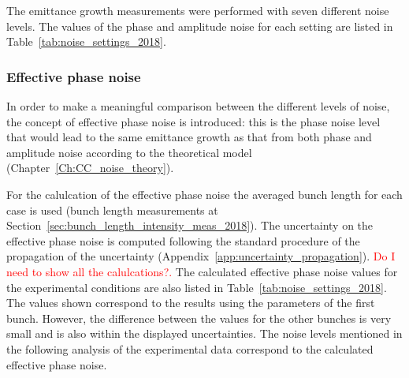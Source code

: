
The emittance growth measurements were performed with seven different noise levels. The values of the phase and amplitude noise for each setting are listed in Table~\ref{tab:noise_settings_2018}. 

\subsubsection*{Effective phase noise}
In order to make a meaningful comparison between the different levels of noise, the concept of effective phase noise is introduced: this is the phase noise level that would lead to the same emittance growth as that from both phase and amplitude noise according to the theoretical model (Chapter~\ref{Ch:CC_noise_theory}). 

For the calulcation of the effective phase noise the averaged bunch length for each case is used (bunch length measurements at Section~\ref{sec:bunch_length_intensity_meas_2018}). The uncertainty on the effective phase noise is computed following the standard procedure of the propagation of the uncertainty (Appendix~\ref{app:uncertainty_propagation}). \textcolor{red}{Do I need to show all the calulcations?.} The calculated effective phase noise values for the experimental conditions are also listed in Table~\ref{tab:noise_settings_2018}. The values shown correspond to the results using the parameters of the first bunch. However, the difference between the values for the other bunches is very small and is also within the displayed uncertainties. The noise levels mentioned in the following analysis of the experimental data correspond to the calculated effective phase noise. 


